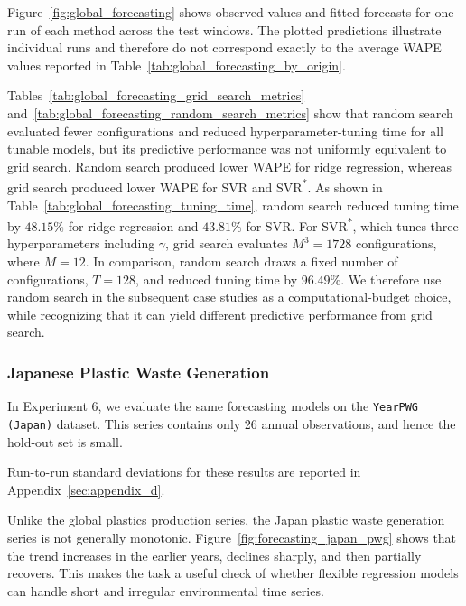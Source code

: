 

Figure~\ref{fig:global_forecasting} shows observed values and fitted forecasts for one run of each method across the test windows.
The plotted predictions illustrate individual runs and therefore do not correspond exactly to the average WAPE values reported in Table~\ref{tab:global_forecasting_by_origin}.

Tables~\ref{tab:global_forecasting_grid_search_metrics} and~\ref{tab:global_forecasting_random_search_metrics} show that random search evaluated fewer configurations and reduced hyperparameter-tuning time for all tunable models, but its predictive performance was not uniformly equivalent to grid search.
Random search produced lower WAPE for ridge regression, whereas grid search produced lower WAPE for SVR and SVR\textsuperscript{*}.
As shown in Table~\ref{tab:global_forecasting_tuning_time}, random search reduced tuning time by \(48.15\%\) for ridge regression and \(43.81\%\) for SVR.
For SVR\textsuperscript{*}, which tunes three hyperparameters including \(\gamma\), grid search evaluates \(M^3 = 1728\) configurations, where \(M = 12\).
In comparison, random search draws a fixed number of configurations, \(T = 128\), and reduced tuning time by \(96.49\%\).
We therefore use random search in the subsequent case studies as a computational-budget choice, while recognizing that it can yield different predictive performance from grid search.





\subsubsection{Japanese Plastic Waste Generation}

In Experiment 6, we evaluate the same forecasting models on the \texttt{YearPWG (Japan)} dataset.
This series contains only 26 annual observations, and hence the hold-out set is small.


Run-to-run standard deviations for these results are reported in Appendix~\ref{sec:appendix_d}.

Unlike the global plastics production series, the Japan plastic waste generation series is not generally monotonic.
Figure~\ref{fig:forecasting_japan_pwg} shows that the trend increases in the earlier years, declines sharply, and then partially recovers.
This makes the task a useful check of whether flexible regression models can handle short and irregular environmental time series.

